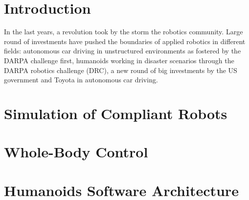 \documentclass[%
	paper=A4,					%
	twoside=true,				%
	openright,			.
	parskip=full,				%
	chapterprefix=true,			%
	11pt,						%
	headings=normal,			%
	bibliography=totoc,			%
	listof=totoc,				%
	titlepage=on,				%
	captions=tableabove,		%
	draft=true,				%
]{scrreprt}%
\begin{document}

\pagestyle{empty}				%
\cleardoublepage

\pagestyle{plain}				%
\cleardoublepage
%
\cleardoublepage
%
\setcounter{tocdepth}{2}		%
\tableofcontents				%
\cleardoublepage

\setcounter{page}{1}			%
\pagestyle{maincontentstyle} 	%

\chapter{Introduction}
In the last years, a revolution took by the storm the robotics community. Large round of investments have pushed the boundaries of applied robotics in different fields: autonomous car driving in unstructured environments as fostered by the DARPA challenge first, humanoids working in disaster scenarios through the DARPA robotics challenge (DRC), a new round of big investments by the US government and Toyota in autonomous car driving.

\chapter{Simulation of Compliant Robots}


\chapter{Whole-Body Control}


\chapter{Humanoids Software Architecture}
\label{architecture}

\end{document}

